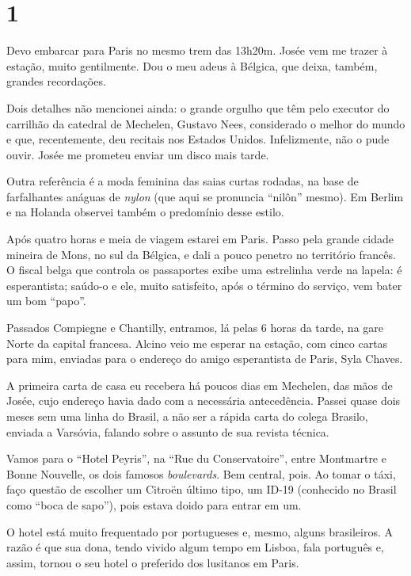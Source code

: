 \section*{1 \adfflatleafright {}}

Devo embarcar para Paris no mesmo trem das 13h20m. Josée vem me trazer à estação, muito gentilmente. Dou o meu adeus à Bélgica, que deixa, também, grandes recordações.

Dois detalhes não mencionei ainda: o grande orgulho que têm pelo executor do carrilhão da catedral de Mechelen, Gustavo Nees, considerado o melhor do mundo e que, recentemente, deu recitais nos Estados Unidos. Infelizmente, não o pude ouvir. Josée me prometeu enviar um disco mais tarde.

Outra referência é a moda feminina das saias curtas rodadas, na base de farfalhantes anáguas de \textit{nylon} (que aqui se pronuncia ``nilôn'' mesmo). Em Berlim e na Holanda observei também o predomínio desse estilo.

Após quatro horas e meia de viagem estarei em Paris. Passo pela grande cidade mineira de Mons, no sul da Bélgica, e dali a pouco penetro no território francês. O fiscal belga que controla os passaportes exibe uma estrelinha verde na lapela: é esperantista; saúdo-o e ele, muito satisfeito, após o término do serviço, vem bater um bom ``papo''.

Passados Compiegne e Chantilly, entramos, lá pelas 6 horas da tarde, na gare Norte da capital francesa. Alcino veio me esperar na estação, com cinco cartas para mim, enviadas para o endereço do amigo esperantista de Paris, Syla Chaves.

A primeira carta de casa eu recebera há poucos dias em Mechelen, das mãos de Josée, cujo endereço havia dado com a necessária antecedência. Passei quase dois meses sem uma linha do Brasil, a não ser a rápida carta do colega Brasilo, enviada a Varsóvia, falando sobre o assunto de sua revista técnica.

Vamos para o ``Hotel Peyris'', na ``Rue du Conservatoire'', entre Montmartre e Bonne Nouvelle, os dois famosos \textit{boulevards}. Bem central, pois. Ao tomar o táxi, faço questão de escolher um Citroën último tipo, um ID-19 (conhecido no Brasil como ``boca de sapo''), pois estava doido para entrar em um.

O hotel está muito frequentado por portugueses e, mesmo, alguns brasileiros. A razão é que sua dona, tendo vivido algum tempo em Lisboa, fala português e, assim, tornou o seu hotel o preferido dos lusitanos em Paris.

